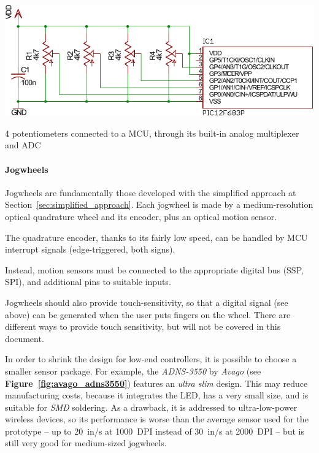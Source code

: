 \documentclass[a4paper,10pt]{article}
\makeatletter
\newenvironment{figurehere}{\def\@captype{figure}\vspace{2ex}}{\vspace{2ex}}
\newcommand{\citef}[1]{\textbf{Figure~\ref{#1}}}
\makeatother
\begin{document}
\begin{multicols}{2}
\begin{figurehere}
	\centering
	\includegraphics[keepaspectratio=true,width=\columnwidth]{images/pots_mcu.pdf}
	\caption{4 potentiometers connected to a MCU, through its built-in analog
	multiplexer and ADC}
	\label{fig:pots_mcu}
\end{figurehere}


\paragraph{Jogwheels}
Jogwheels are fundamentally those developed with the simplified approach at
Section~\ref{sec:simplified_approach}. Each jogwheel is made by a
medium-resolution optical quadrature wheel and its encoder, plus an optical
motion sensor.

The quadrature encoder, thanks to its fairly low speed, can be handled by
MCU interrupt signals (edge-triggered, both signs).

Instead, motion sensors must be connected to the appropriate digital bus
(SSP, SPI), and additional pins to suitable inputs.

Jogwheels should also provide touch-sensitivity, so that a digital signal
(see above) can be generated when the user puts fingers on the wheel.
There are different ways to provide touch sensitivity, but will not be
covered in this document.

In order to shrink the design for low-end controllers, it is possible to
choose a smaller sensor package. For example, the \emph{ADNS-3550} by
\emph{Avago} \cite{avago_adns3550} (see \citef{fig:avago_adns3550}) features
an \emph{ultra slim} design. This may reduce manufacturing costs, because it
integrates the LED, has a very small size, and is suitable for \emph{SMD}
soldering. As a drawback, it is addressed to ultra-low-power wireless devices,
so its performance is worse than the average sensor used for the prototype --
up to 20~in/s at 1000~DPI instead of 30~in/s at 2000~DPI -- but is still
very good for medium-sized jogwheels.


\end{multicols}
\end{document}
